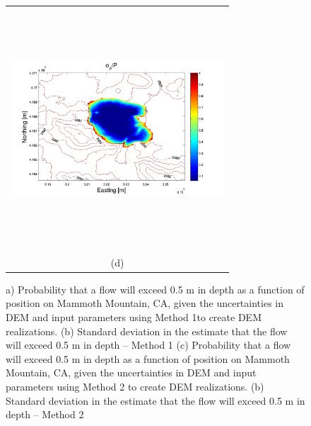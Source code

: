 \documentclass[12pt]{article}
\begin{document}
\begin{figure}[H]
\begin{minipage}{0.6\textwidth}
\begin{tabular}{c}
	\includegraphics[width=8cm,height=9cm,keepaspectratio]{Mammoth_3_sigma.pdf}\\
        (d)
        \end{tabular}
    \end{minipage} 
    \caption{a) Probability that a flow will exceed 0.5 m in depth as
      a function of position on Mammoth Mountain, CA, given the
      uncertainties in DEM and input parameters using Method 1to
      create DEM realizations. (b) Standard deviation in the estimate
      that the flow will exceed 0.5 m in depth -- Method 1 (c)
      Probability that a flow will exceed 0.5 m in depth as a function
      of position on Mammoth Mountain, CA, given the uncertainties in
      DEM and input parameters using Method 2 to create DEM
      realizations.  (b) Standard deviation in the estimate that the
      flow will exceed 0.5 m in depth -- Method 2 }
\label{fig4}  
\end{figure}


\end{document}
